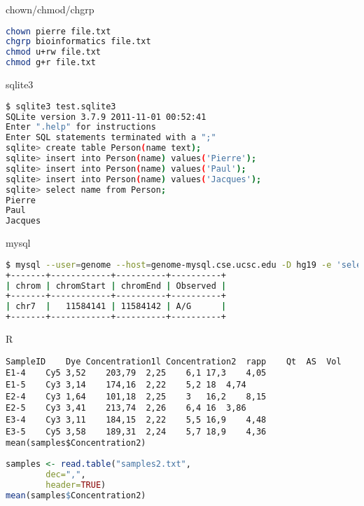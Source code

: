 \documentclass{beamer}
\begin{document}
\begin{frame}[fragile]
 \begin{center}
    \huge{chown/chmod/chgrp}\\
    \end{center}
\begin{lstlisting}[language=bash,breaklines=true]
chown pierre file.txt
chgrp bioinformatics file.txt
chmod u+rw file.txt
chmod g+r file.txt
\end{lstlisting}
\end{frame} 

\begin{frame}[fragile]
\begin{center}
    \huge{sqlite3}\\
    \end{center}
\begin{lstlisting}[language=bash]  
$ sqlite3 test.sqlite3
SQLite version 3.7.9 2011-11-01 00:52:41
Enter ".help" for instructions
Enter SQL statements terminated with a ";"
sqlite> create table Person(name text);
sqlite> insert into Person(name) values('Pierre');
sqlite> insert into Person(name) values('Paul');
sqlite> insert into Person(name) values('Jacques');
sqlite> select name from Person;
Pierre
Paul
Jacques
\end{lstlisting}
\end{frame}



\begin{frame}[fragile]
\begin{center}
    \huge{mysql}\\
    \end{center}
\begin{lstlisting}[language=bash,breaklines=true]  
$ mysql --user=genome --host=genome-mysql.cse.ucsc.edu -D hg19 -e 'select chrom,chromStart,chromEnd,Observed from snp141 where name="rs25"'
+-------+------------+----------+----------+
| chrom | chromStart | chromEnd | Observed |
+-------+------------+----------+----------+
| chr7  |   11584141 | 11584142 | A/G      |
+-------+------------+----------+----------+
\end{lstlisting}
\end{frame}


\begin{frame}[fragile]
 \begin{center}
    \huge{R}\\
    \end{center}
\begin{lstlisting}
SampleID	Dye	Concentration1l	Concentration2	rapp	Qt	AS	Vol
E1-4	Cy5	3,52	203,79	2,25	6,1	17,3	4,05
E1-5	Cy3	3,14	174,16	2,22	5,2	18	4,74
E2-4	Cy3	1,64	101,18	2,25	3	16,2	8,15
E2-5	Cy3	3,41	213,74	2,26	6,4	16	3,86
E3-4	Cy3	3,11	184,15	2,22	5,5	16,9	4,48
E3-5	Cy5	3,58	189,31	2,24	5,7	18,9	4,36
mean(samples$Concentration2)
\end{lstlisting}
\begin{lstlisting}[language=R]
    samples <- read.table("samples2.txt",
    	dec=",",
    	header=TRUE)
mean(samples$Concentration2)
\end{lstlisting}
\end{frame}
\end{document}
